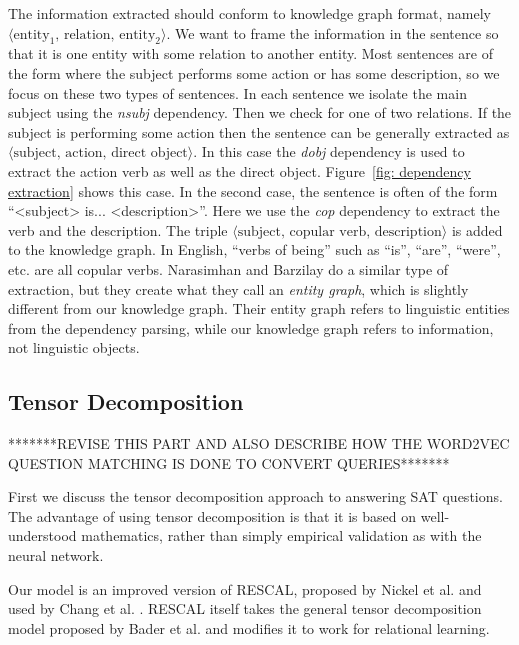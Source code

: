 \documentclass[pageno]{final_paper}
\begin{document}
The information extracted should conform to knowledge graph format, namely
\\$\langle \text{entity}_1, \,\text{relation}, \,\text{entity}_2 \rangle$. We
want to frame the information in the sentence so that it is one entity with some
relation to another entity. Most sentences are of the form where the subject
performs some action or has some description, so we focus on these two types of
sentences. In each sentence we isolate the main subject using the \textit{nsubj}
dependency. Then we check for one of two relations. If the subject is performing
some action then the sentence can be generally extracted as $\langle
\text{subject}, \,\text{action}, \,\text{direct object} \rangle$. In this case
the \textit{dobj} dependency is used to extract the action verb as well as the
direct object. Figure~\ref{fig: dependency extraction} shows this case. In the
second case, the sentence is often of the form ``<subject> is...
<description>''. Here we use the \textit{cop} dependency to extract the verb and
the description. The triple $\langle \text{subject}, \,\text{copular verb},
\,\text{description} \rangle$ is added to the knowledge graph. In English,
``verbs of being'' such as ``is'', ``are'', ``were'', etc. are all copular
verbs. Narasimhan and Barzilay \cite{Narasimhan2015} do a similar type of
extraction, but they create what they call an \textit{entity graph}, which is
slightly different from our knowledge graph. Their entity graph refers to
linguistic entities from the dependency parsing, while our knowledge graph
refers to information, not linguistic objects.

\subsection{Tensor Decomposition}
\label{Tensor Decomposition}

*******REVISE THIS PART AND ALSO DESCRIBE HOW THE WORD2VEC QUESTION MATCHING
IS DONE TO CONVERT QUERIES*******

First we discuss the tensor decomposition approach to answering SAT questions.
The advantage of using tensor decomposition is that it is based on
well-understood mathematics, rather than simply empirical validation as with the
neural network.

Our model is an improved version of RESCAL, proposed by Nickel et al.
\cite{Nickel2011} and used by Chang et al. \cite{Chang2014}. RESCAL itself takes
the general tensor decomposition model proposed by Bader et al. \cite{Bader2007}
and modifies it to work for relational learning. \\
\end{document}
